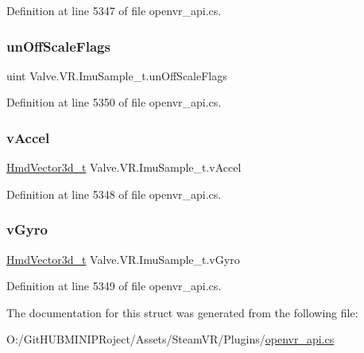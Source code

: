 Definition at line 5347 of file openvr\+\_\+api.\+cs.

\mbox{\label{struct_valve_1_1_v_r_1_1_imu_sample__t_af6856ff4286e941c91c3c1a61343f905}} 
\subsubsection{\texorpdfstring{unOffScaleFlags}{unOffScaleFlags}}
{\footnotesize\ttfamily uint Valve.\+V\+R.\+Imu\+Sample\+\_\+t.\+un\+Off\+Scale\+Flags}



Definition at line 5350 of file openvr\+\_\+api.\+cs.

\mbox{\label{struct_valve_1_1_v_r_1_1_imu_sample__t_a0f03d744ea1e9cc7a33a1cc45cbaf36e}} 
\subsubsection{\texorpdfstring{vAccel}{vAccel}}
{\footnotesize\ttfamily \mbox{\hyperlink{struct_valve_1_1_v_r_1_1_hmd_vector3d__t}{Hmd\+Vector3d\+\_\+t}} Valve.\+V\+R.\+Imu\+Sample\+\_\+t.\+v\+Accel}



Definition at line 5348 of file openvr\+\_\+api.\+cs.

\mbox{\label{struct_valve_1_1_v_r_1_1_imu_sample__t_adef84df4b5b11ab7fae3af8e396e1a69}} 
\subsubsection{\texorpdfstring{vGyro}{vGyro}}
{\footnotesize\ttfamily \mbox{\hyperlink{struct_valve_1_1_v_r_1_1_hmd_vector3d__t}{Hmd\+Vector3d\+\_\+t}} Valve.\+V\+R.\+Imu\+Sample\+\_\+t.\+v\+Gyro}



Definition at line 5349 of file openvr\+\_\+api.\+cs.



The documentation for this struct was generated from the following file\+:\begin{DoxyCompactItemize}
\item 
O\+:/\+Git\+H\+U\+B\+M\+I\+N\+I\+P\+Roject/\+Assets/\+Steam\+V\+R/\+Plugins/\mbox{\hyperlink{openvr__api_8cs}{openvr\+\_\+api.\+cs}}\end{DoxyCompactItemize}
